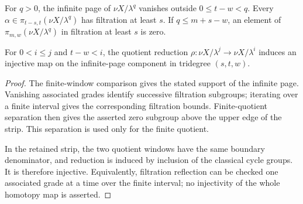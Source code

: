 \begin{theorem}
\label{sem:ProofTools:finite-strip}
For $q>0$, the infinite page of $\nu X/\lambda^q$ vanishes outside $0\leq t-w<q$. Every $\alpha\in\pi_{t-s,t}(\nu X/\lambda^q)$ has filtration at least $s$. If $q\leq m+s-w$, an element of $\pi_{m,w}(\nu X/\lambda^q)$ in filtration at least $s$ is zero.

For $0<i\leq j$ and $t-w<i$, the quotient reduction $\rho:\nu X/\lambda^j\to\nu X/\lambda^i$ induces an injective map on the infinite-page component in tridegree $(s,t,w)$.
\end{theorem}
\begin{proof}
The finite-window comparison gives the stated support of the infinite page. Vanishing associated grades identify successive filtration subgroups; iterating over a finite interval gives the corresponding filtration bounds. Finite-quotient separation then gives the asserted zero subgroup above the upper edge of the strip. This separation is used only for the finite quotient.

In the retained strip, the two quotient windows have the same boundary denominator, and reduction is induced by inclusion of the classical cycle groups. It is therefore injective. Equivalently, filtration reflection can be checked one associated grade at a time over the finite interval; no injectivity of the whole homotopy map is asserted.
\end{proof}

